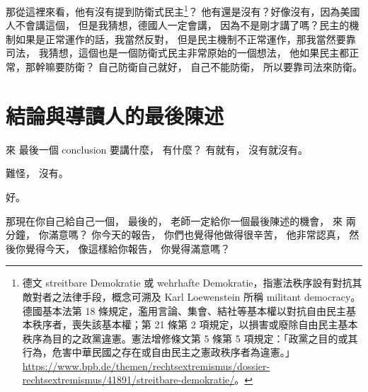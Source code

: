 \hypertarget{w06:cue:3200}{}那從這裡來看，他有沒有提到防衛式民主\footnote{德文 streitbare Demokratie 或 wehrhafte Demokratie，指憲法秩序設有對抗其敵對者之法律手段，概念可溯及 Karl Loewenstein 所稱 militant democracy。德國基本法第 18 條規定，濫用言論、集會、結社等基本權以對抗自由民主基本秩序者，喪失該基本權；第 21 條第 2 項規定，以損害或廢除自由民主基本秩序為目的之政黨違憲。憲法增修條文第 5 條第 5 項規定：「政黨之目的或其行為，危害中華民國之存在或自由民主之憲政秩序者為違憲。」\url{https://www.bpb.de/themen/rechtsextremismus/dossier-rechtsextremismus/41891/streitbare-demokratie/}。}？
\hypertarget{w06:cue:3201}{}他有還是沒有？好像沒有，因為美國人不會講這個，
\hypertarget{w06:cue:3202}{}但是我猜想，德國人一定會講，
\hypertarget{w06:cue:3203}{}因為不是剛才講了嗎？民主的機制如果是正常運作的話，我當然反對，
\hypertarget{w06:cue:3204}{}但是民主機制不正常運作，那我當然要靠司法，
\hypertarget{w06:cue:3205}{}我猜想，這個也是一個防衛式民主非常原始的一個想法，
\hypertarget{w06:cue:3206}{}他如果民主都正常，那幹嘛要防衛？
\hypertarget{w06:cue:3207}{}自己防衛自己就好，
\hypertarget{w06:cue:3208}{}自己不能防衛，
\hypertarget{w06:cue:3209}{}所以要靠司法來防衛。

\section{結論與導讀人的最後陳述}

\hypertarget{w06:cue:3210}{}來 最後一個 conclusion 要講什麼，
\hypertarget{w06:cue:3211}{}有什麼？
\hypertarget{w06:cue:3212}{}有就有，
\hypertarget{w06:cue:3213}{}沒有就沒有。

\hypertarget{w06:cue:3214}{}難怪，
\hypertarget{w06:cue:3215}{}沒有。

\hypertarget{w06:cue:3216}{}好。

\hypertarget{w06:cue:3217}{}那現在你自己給自己一個，
\hypertarget{w06:cue:3218}{}最後的，
\hypertarget{w06:cue:3219}{}老師一定給你一個最後陳述的機會，
\hypertarget{w06:cue:3220}{}來 兩分鐘，
\hypertarget{w06:cue:3221}{}你滿意嗎？
\hypertarget{w06:cue:3222}{}你今天的報告，
\hypertarget{w06:cue:3223}{}你們也覺得他做得很辛苦，
\hypertarget{w06:cue:3224}{}他非常認真，
\hypertarget{w06:cue:3225}{}然後你覺得今天，
\hypertarget{w06:cue:3226}{}像這樣給你報告，
\hypertarget{w06:cue:3227}{}你覺得滿意嗎？

